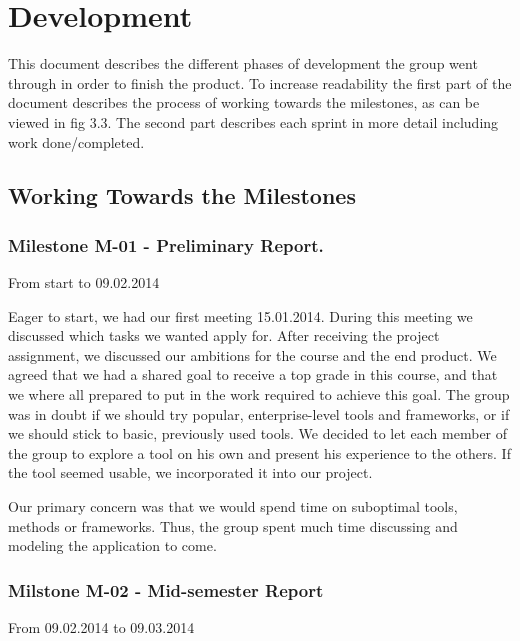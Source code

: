
\chapter{Development}

This document describes the different phases of development the group
went through in order to finish the product. To increase readability
the first part of the document describes the process of working towards the
milestones, as can be viewed in fig 3.3. The second part describes
each sprint in more detail including work done/completed. 




\section{Working Towards the Milestones}




\subsection{Milestone M-01 - Preliminary Report.}
\label{sec:M01}

From start to 09.02.2014

Eager to start, we had our first meeting 15.01.2014. During this meeting
we discussed which tasks we wanted apply for.
After receiving the project assignment, we discussed our ambitions for
the course and the end product. We agreed that we had a shared goal to
receive a top grade in this course, and that we where all prepared to put 
in the work required to achieve this goal. The group was in doubt
if we should try popular, enterprise-level tools and frameworks, or if
we should stick to basic, previously used tools. We decided to let each
member of the group to explore a tool on his own and present his
experience to the others. If the tool seemed usable, we incorporated it
into our project.




Our primary concern was that we would spend time on suboptimal tools,
methods or frameworks. Thus, the group spent much time discussing and
modeling the application to come. 




\subsection{Milstone M-02 - Mid-semester Report}
\label{sec:M02}
From 09.02.2014 to 09.03.2014

